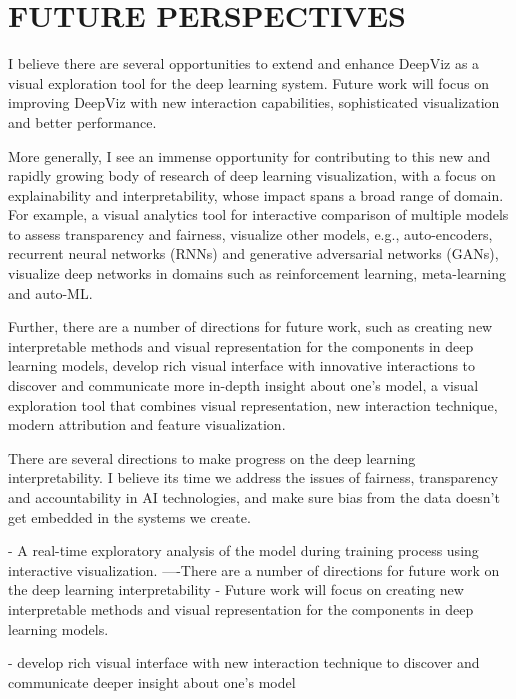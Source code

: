 \chapter{FUTURE PERSPECTIVES}
\thispagestyle{empty}

I believe there are several opportunities to extend and enhance DeepViz as a visual exploration tool for the deep learning system. Future work will focus on improving DeepViz with new interaction capabilities, sophisticated visualization and better performance.

More generally, I see an immense opportunity for contributing to this new and rapidly growing body of research of deep learning visualization, with a focus on explainability and interpretability, whose impact spans a broad range of domain. For example, a visual analytics tool for interactive comparison of multiple models to assess transparency and fairness, visualize other models, e.g., auto-encoders, recurrent neural networks (RNNs) and generative adversarial networks (GANs), visualize deep networks in domains such as reinforcement learning, meta-learning and auto-ML.

Further, there are a number of directions for future work, such as creating new interpretable methods and visual representation for the components in deep learning models, develop rich visual interface with innovative interactions to discover and communicate more in-depth insight about one's model, a visual exploration tool that combines visual representation, new interaction technique, modern attribution and feature visualization.

There are several directions to make progress on the deep learning interpretability. I believe its time we address the issues of fairness, transparency and accountability in AI technologies, and make sure bias from the data doesn't get embedded in the systems we create.


\iffalse %

- A real-time exploratory analysis of the model during training process using interactive visualization. 
----There are a number of directions for future work on the deep learning interpretability
- Future work will focus on creating new interpretable methods and visual representation for the components in deep learning models.

- develop rich visual interface with new interaction technique to discover and communicate deeper insight about one's model

